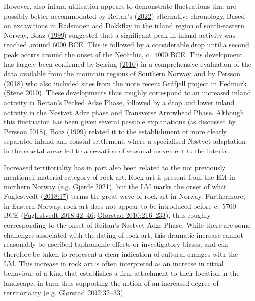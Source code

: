 \documentclass[
  12pt,
  a4paper,
  oneside]{book}
\begin{document}
However, also inland utilisation appears to demonstrate fluctuations that are possibly better accommodated by Reitan's (\protect\hyperlink{ref-reitan2022}{2022}) alternative chronology. Based on excavations in Rødsmoen and Dokkfløy in the inland region of south-eastern Norway, Boaz (\protect\hyperlink{ref-boaz1999}{1999}) suggested that a significant peak in inland activity was reached around 6000 BCE. This is followed by a considerable drop until a second peak occurs around the onset of the Neolithic, c.~4000 BCE. This development has largely been confirmed by Selsing (\protect\hyperlink{ref-selsing2010}{2010}) in a comprehensive evaluation of the data available from the mountain regions of Southern Norway, and by Persson (\protect\hyperlink{ref-persson2018}{2018}) who also included sites from the more recent Gråfjell project in Hedmark (\protect\hyperlink{ref-stene2010}{Stene 2010}). These developments thus roughly correspond to an increased inland activity in Reitan's Pecked Adze Phase, followed by a drop and lower inland activity in the Nøstvet Adze phase and Transverse Arrowhead Phase. Although this fluctuation has been given several possible explanations (as discussed by \protect\hyperlink{ref-persson2018}{Persson 2018}), Boaz (\protect\hyperlink{ref-boaz1999}{1999}) related it to the establishment of more clearly separated inland and coastal settlement, where a specialised Nøstvet adaptation in the coastal areas led to a cessation of seasonal movement to the interior.

Increased territoriality has in part also been related to the not previously mentioned material category of rock art. Rock art is present from the EM in northern Norway (e.g. \protect\hyperlink{ref-gjerde2021}{Gjerde 2021}), but the LM marks the onset of what Fuglestvedt (\protect\hyperlink{ref-fuglestvedt2018}{2018:17}) terms \textquotesingle the great wave\textquotesingle{} of rock art in Norway. Furthermore, in Eastern Norway, rock art does not appear to be introduced before c.~5700 BCE (\protect\hyperlink{ref-fuglestvedt2018}{Fuglestvedt 2018:42--46}; \protect\hyperlink{ref-glorstad2010}{Glørstad 2010:216--233}), thus roughly corresponding to the onset of Reitan's Nøstvet Adze Phase. While there are some challenges associated with the dating of rock art, this dramatic increase cannot reasonably be ascribed taphonomic effects or investigatory biases, and can therefore be taken to represent a clear indication of cultural changes with the LM. This increase in rock art is often interpreted as an increase in ritual behaviour of a kind that establishes a firm attachment to their location in the landscape, in turn thus supporting the notion of an increased degree of territoriality (e.g. \protect\hyperlink{ref-glorstad2002}{Glørstad 2002:32--33}).
\end{document}

